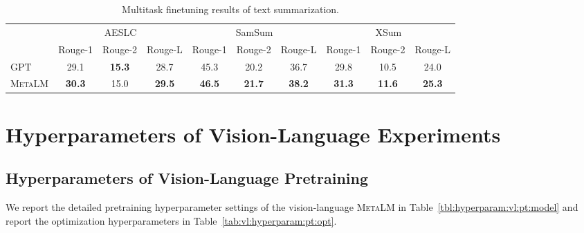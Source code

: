 \documentclass{article}
\theoremstyle{plain}
\theoremstyle{definition}
\theoremstyle{remark}
\newcommand\ours{\textsc{MetaLM}}
\begin{document}
\begin{table}[tp!]
\centering
\renewcommand\tabcolsep{3.5pt}
\footnotesize
\begin{tabular}{l c c c c c c c c c}
\toprule
 & \multicolumn{3}{c}{AESLC} & \multicolumn{3}{c}{SamSum} & \multicolumn{3}{c}{XSum} \\
 \cmidrule(r){2-4} \cmidrule(l){5-7} \cmidrule(l){8-10}
 & {Rouge-1} & {Rouge-2} & {Rouge-L} & {Rouge-1} & {Rouge-2} & {Rouge-L} & {Rouge-1} & {Rouge-2} & {Rouge-L} \\
 \midrule
GPT & 29.1 & \textbf{15.3} & 28.7 & 45.3 & 20.2 & 36.7 & 29.8 & 10.5 & 24.0 \\
\ours{} & \textbf{30.3}& 15.0& \textbf{29.5}& \textbf{46.5}& \textbf{21.7}& \textbf{38.2}& \textbf{31.3}& \textbf{11.6}& \textbf{25.3} \\
\bottomrule
\end{tabular}
\caption{Multitask finetuning results of text summarization.}
\label{tbl:multi:summ}
\end{table}

\section{Hyperparameters of Vision-Language Experiments}

\subsection{Hyperparameters of Vision-Language Pretraining}
\label{app:hyperparam:pt:vl}

We report the detailed pretraining hyperparameter settings of the vision-language \ours{} in Table~\ref{tbl:hyperparam:vl:pt:model} and report the optimization hyperparameters in Table~\ref{tab:vl:hyperparam:pt:opt}.
\end{document}
